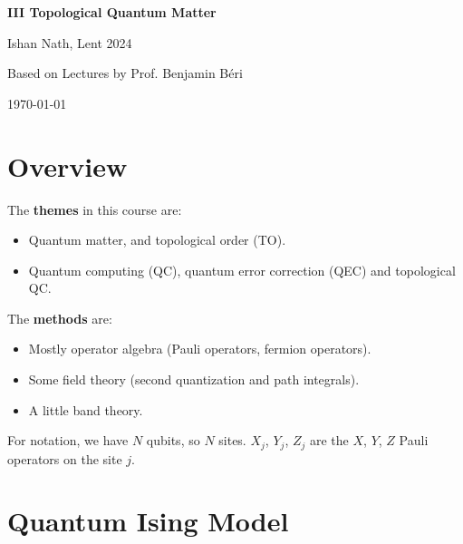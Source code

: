 \documentclass[12pt]{article}
\begin{document}
\hypersetup{pageanchor=false}
\begin{titlepage}
	\begin{center}
		\vspace*{1em}
		\Huge
		\textbf{III Topological Quantum Matter}

		\vspace{1em}
		\large
		Ishan Nath, Lent 2024

		\vspace{1.5em}

		\Large

		Based on Lectures by Prof. Benjamin B\'eri

		\vspace{1em}

		\large
		\today
	\end{center}
	
\end{titlepage}
\hypersetup{pageanchor=true}

\tableofcontents

\newpage


\setcounter{section}{-1}

\section{Overview}%
\label{sub:o}

The \textbf{themes} in this course are:
\begin{itemize}
	\item Quantum matter, and topological order (TO).
	\item Quantum computing (QC), quantum error correction (QEC) and topological QC.
\end{itemize}

The \textbf{methods} are:
\begin{itemize}
	\item Mostly operator algebra (Pauli operators, fermion operators).
	\item Some field theory (second quantization and path integrals).
	\item A little band theory.
\end{itemize}

For notation, we have $N$ qubits, so $N$ sites. $X_j$, $Y_j$, $Z_j$ are the $X$, $Y$, $Z$ Pauli operators on the site $j$.

\newpage

\section{Quantum Ising Model}%
\label{sec:qim}
\end{document}
